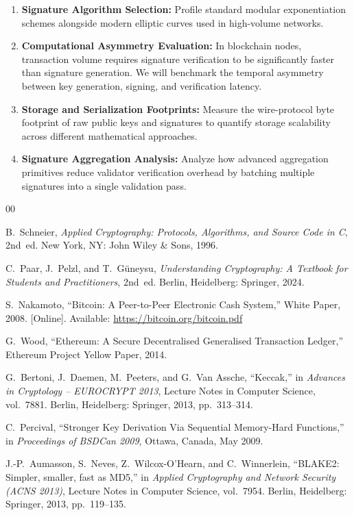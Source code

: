 \documentclass[11pt,a4paper,oneside]{book}
\begin{document}
\begin{enumerate}
    \item \textbf{Signature Algorithm Selection:} Profile standard modular exponentiation schemes alongside modern elliptic curves used in high-volume networks.
    \item \textbf{Computational Asymmetry Evaluation:} In blockchain nodes, transaction volume requires signature verification to be significantly faster than signature generation. We will benchmark the temporal asymmetry between key generation, signing, and verification latency.
    \item \textbf{Storage and Serialization Footprints:} Measure the wire-protocol byte footprint of raw public keys and signatures to quantify storage scalability across different mathematical approaches.
    \item \textbf{Signature Aggregation Analysis:} Analyze how advanced aggregation primitives reduce validator verification overhead by batching multiple signatures into a single validation pass.
\end{enumerate}


\begin{thebibliography}{00}

    B.~Schneier, \emph{Applied Cryptography: Protocols, Algorithms, and Source Code in C}, 2nd~ed. New York, NY: John Wiley \& Sons, 1996.

    C.~Paar, J.~Pelzl, and T.~G{\"u}neysu, \emph{Understanding Cryptography: A Textbook for Students and Practitioners}, 2nd~ed. Berlin, Heidelberg: Springer, 2024.

    S.~Nakamoto, ``Bitcoin: A Peer-to-Peer Electronic Cash System,'' White Paper, 2008. [Online]. Available: \url{https://bitcoin.org/bitcoin.pdf}

    G.~Wood, ``Ethereum: A Secure Decentralised Generalised Transaction Ledger,'' Ethereum Project Yellow Paper, 2014.

    G.~Bertoni, J.~Daemen, M.~Peeters, and G.~Van Assche, ``Keccak,'' in \emph{Advances in Cryptology -- EUROCRYPT 2013}, Lecture Notes in Computer Science, vol.~7881. Berlin, Heidelberg: Springer, 2013, pp.~313--314.

    C.~Percival, ``Stronger Key Derivation Via Sequential Memory-Hard Functions,'' in \emph{Proceedings of BSDCan 2009}, Ottawa, Canada, May 2009.

    J.-P.~Aumasson, S.~Neves, Z.~Wilcox-O'Hearn, and C.~Winnerlein, ``BLAKE2: Simpler, smaller, fast as MD5,'' in \emph{Applied Cryptography and Network Security (ACNS 2013)}, Lecture Notes in Computer Science, vol.~7954. Berlin, Heidelberg: Springer, 2013, pp.~119--135.

\end{thebibliography}
\end{document}
